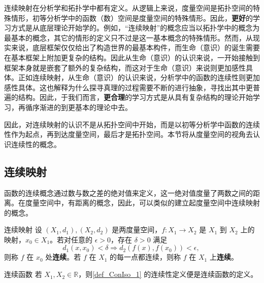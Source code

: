 
连续映射在分析学和拓扑学中都有定义。从逻辑上来说，度量空间是拓扑空间的特殊情形，初等分析学中的函数（数）空间是度量空间的特殊情形。因此，\textbf{更好}的学习方式是从底层理论开始学的。例如，“连续映射”的概念应当以拓扑学中的概念为最基本的概念，其它的情形的定义只不过是这一基本概念的特殊情形。然而，从现实来说，底层框架仅仅给出了构造世界的最基本构件，而生命（意识）的诞生需要在基本框架上附加更复杂的结构。因此从生命（意识）的认识来说，一开始接触到框架本身就是嵌套了额外的复杂结构，而这对于生命（意识）来说则更加感性具体。正如连续映射，从生命（意识）的认识来说，分析学中的函数的连续性则更加感性具体。这也解释为什么探寻真理的过程需要不断的进行抽象，寻找出其中更普遍的结构。因此，于我们而言，\textbf{更合理}的学习方式是从具有复杂结构的理论开始学习，再循序渐进的到更基本的理论中去。

因此，对连续映射的认识不是从拓扑空间中开始，而是以初等分析学中函数的连续性作为起点，再到达度量空间，最后才是拓扑空间。本节将从度量空间的视角去认识连续性的概念。

\subsection{连续映射}
函数的连续概念通过数与数之差的绝对值来定义，这一绝对值度量了两数之间的距离。在度量空间中，有距离的概念，因此，可以类似的建立起度量空间中连续映射的概念。
\begin{definition}{连续映射}\label{def_ConIso_1}
设 $(X_1,d_1),(X_2,d_2)$ 是两度量空间，$f:X_1\rightarrow X_2$ 是 $X_1$ 到 $X_2$ 上的映射，$x_0\in X_1$。若对任意的 $\epsilon>0$，存在 $\delta>0$ 满足
\begin{equation}
d_1(x,x_0)<\delta \Rightarrow d_2(f(x),f(x_0))<\epsilon,~
\end{equation}
则称 $f$ 在 $x_0$ 处\textbf{连续}。若 $f$ 在 $X_1$ 的每一点都连续，则称 $f$ 在 $X_1$ 上\textbf{连续}。
\end{definition}

\begin{example}{连续函数}
若 $X_1,X_2\in\mathbb R$，则\autoref{def_ConIso_1} 的连续性定义便是连续函数的定义。
\end{example}












